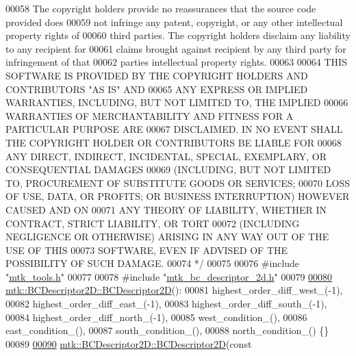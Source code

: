 \begin{DoxyCode}
00058 \textcolor{comment}{The copyright holders provide no reassurances that the source code provided does}
00059 \textcolor{comment}{not infringe any patent, copyright, or any other intellectual property rights of}
00060 \textcolor{comment}{third parties. The copyright holders disclaim any liability to any recipient for}
00061 \textcolor{comment}{claims brought against recipient by any third party for infringement of that}
00062 \textcolor{comment}{parties intellectual property rights.}
00063 \textcolor{comment}{}
00064 \textcolor{comment}{THIS SOFTWARE IS PROVIDED BY THE COPYRIGHT HOLDERS AND CONTRIBUTORS "AS IS" AND}
00065 \textcolor{comment}{ANY EXPRESS OR IMPLIED WARRANTIES, INCLUDING, BUT NOT LIMITED TO, THE IMPLIED}
00066 \textcolor{comment}{WARRANTIES OF MERCHANTABILITY AND FITNESS FOR A PARTICULAR PURPOSE ARE}
00067 \textcolor{comment}{DISCLAIMED. IN NO EVENT SHALL THE COPYRIGHT HOLDER OR CONTRIBUTORS BE LIABLE FOR}
00068 \textcolor{comment}{ANY DIRECT, INDIRECT, INCIDENTAL, SPECIAL, EXEMPLARY, OR CONSEQUENTIAL DAMAGES}
00069 \textcolor{comment}{(INCLUDING, BUT NOT LIMITED TO, PROCUREMENT OF SUBSTITUTE GOODS OR SERVICES;}
00070 \textcolor{comment}{LOSS OF USE, DATA, OR PROFITS; OR BUSINESS INTERRUPTION) HOWEVER CAUSED AND ON}
00071 \textcolor{comment}{ANY THEORY OF LIABILITY, WHETHER IN CONTRACT, STRICT LIABILITY, OR TORT}
00072 \textcolor{comment}{(INCLUDING NEGLIGENCE OR OTHERWISE) ARISING IN ANY WAY OUT OF THE USE OF THIS}
00073 \textcolor{comment}{SOFTWARE, EVEN IF ADVISED OF THE POSSIBILITY OF SUCH DAMAGE.}
00074 \textcolor{comment}{*/}
00075 
00076 \textcolor{preprocessor}{#include "\hyperlink{mtk__tools_8h}{mtk\_tools.h}"}
00077 
00078 \textcolor{preprocessor}{#include "\hyperlink{mtk__bc__descriptor__2d_8h}{mtk\_bc\_descriptor\_2d.h}"}
00079 
\hypertarget{mtk__bc__descriptor__2d_8cc_source_l00080}{}\hyperlink{classmtk_1_1BCDescriptor2D_abbc3af29202dbfef203f4cafd9566fd0}{00080} \hyperlink{classmtk_1_1BCDescriptor2D_abbc3af29202dbfef203f4cafd9566fd0}{mtk::BCDescriptor2D::BCDescriptor2D}():
00081   highest\_order\_diff\_west\_(-1),
00082   highest\_order\_diff\_east\_(-1),
00083   highest\_order\_diff\_south\_(-1),
00084   highest\_order\_diff\_north\_(-1),
00085   west\_condition\_(),
00086   east\_condition\_(),
00087   south\_condition\_(),
00088   north\_condition\_() \{\}
00089 
\hypertarget{mtk__bc__descriptor__2d_8cc_source_l00090}{}\hyperlink{classmtk_1_1BCDescriptor2D_ae8a93352a94efed52747b710e6ff7893}{00090} \hyperlink{classmtk_1_1BCDescriptor2D_abbc3af29202dbfef203f4cafd9566fd0}{mtk::BCDescriptor2D::BCDescriptor2D}(\textcolor{keyword}{const} 

\end{DoxyCode}
